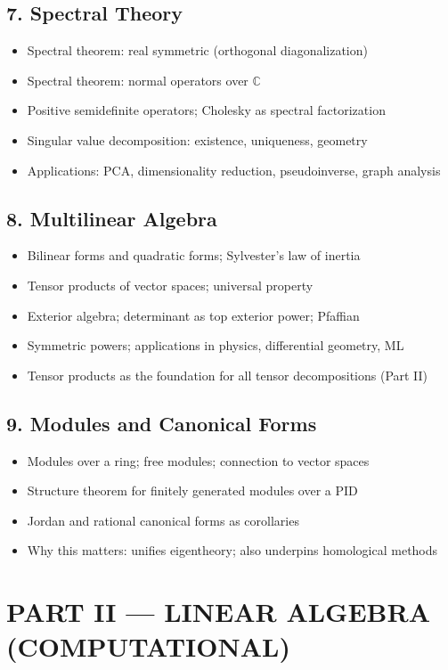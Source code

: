 \subsection{7. Spectral Theory}
\begin{itemize}
\item Spectral theorem: real symmetric (orthogonal diagonalization)
\item Spectral theorem: normal operators over $\mathbb{C}$
\item Positive semidefinite operators; Cholesky as spectral factorization
\item Singular value decomposition: existence, uniqueness, geometry
\item Applications: PCA, dimensionality reduction, pseudoinverse, graph analysis
\end{itemize}

\subsection{8. Multilinear Algebra}
\begin{itemize}
\item Bilinear forms and quadratic forms; Sylvester's law of inertia
\item Tensor products of vector spaces; universal property
\item Exterior algebra; determinant as top exterior power; Pfaffian
\item Symmetric powers; applications in physics, differential geometry, ML
\item Tensor products as the foundation for all tensor decompositions (Part II)
\end{itemize}

\subsection{9. Modules and Canonical Forms}
\begin{itemize}
\item Modules over a ring; free modules; connection to vector spaces
\item Structure theorem for finitely generated modules over a PID
\item Jordan and rational canonical forms as corollaries
\item Why this matters: unifies eigentheory; also underpins homological methods
\end{itemize}

\section{PART II --- LINEAR ALGEBRA (COMPUTATIONAL)}

